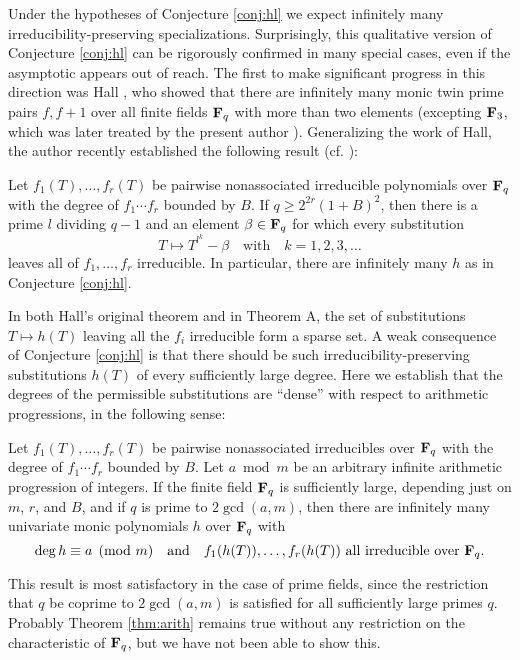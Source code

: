 \documentclass[a4paper]{compositio}
\begin{document}
Under the hypotheses of Conjecture \ref{conj:hl} we expect
infinitely many irreducibility-preserving specializations.
Surprisingly, this qualitative version of Conjecture \ref{conj:hl}
can be rigorously confirmed in many special  cases, even if the
asymptotic appears out of reach. The first to make significant
progress in this direction was Hall \cite{hall06}, who showed that
there are infinitely many monic twin prime pairs $f, f+1$ over all
finite fields $\mathbf{F}_q$ with more than two elements (excepting $\mathbf{F}_3$,
which was later treated by the present author \cite[Theorem
1]{pollack06a}). Generalizing the work of Hall, the author recently
established the following result (cf. \cite[Theorem 2]{pollack06a}):
\begin{thma} Let $f_1(T), \dots, f_r(T)$ be
pairwise nonassociated irreducible polynomials over $\mathbf{F}_q$ with the
degree of $f_1 \cdots f_r$ bounded by $B$. If $q \geq 2^{2r} \left(1
+ B\right)^2$, then there is a prime $l$ dividing $q-1$ and an
element $\beta \in \mathbf{F}_q$ for which every substitution
\[ T \mapsto T^{l^k}-\beta \quad \text{with} \quad k=1, 2, 3, \dots \]
leaves all of $f_1, \dots, f_r$ irreducible. In particular, there
are infinitely many $h$ as in Conjecture \ref{conj:hl}.
\end{thma}
In both Hall's original theorem and in Theorem A, the set of
substitutions $T \mapsto h(T)$ leaving all the $f_i$ irreducible
form a sparse set. A weak consequence of Conjecture \ref{conj:hl} is
that there should be such irreducibility-preserving substitutions
$h(T)$ of every sufficiently large degree. Here we establish that
the degrees of the permissible substitutions are ``dense'' with
respect to arithmetic progressions, in the following sense:

\begin{thm}\label{thm:arith} Let $f_1(T), \dots, f_r(T)$ be pairwise
nonassociated irreducibles over $\mathbf{F}_q$ with the degree of $f_1
\cdots f_r$ bounded by $B$. Let $a \bmod m$ be an arbitrary infinite
arithmetic progression of integers. If the finite field $\mathbf{F}_q$ is
sufficiently large, depending just on $m$, $r$, and $B$, and if $q$
is prime to $2\gcd(a,m)$, then there are infinitely many univariate
monic polynomials $h$ over $\mathbf{F}_q$ with
\[ \deg{h} \equiv a \pmod{m} \quad \text{and} \quad f_1(h(T)), \dots, f_r(h(T)) \text{ all irreducible over
$\mathbf{F}_q$}. \]
\end{thm}
This result is most satisfactory in the case of prime fields, since
the restriction that $q$ be coprime to $2\gcd(a,m)$ is satisfied for
all sufficiently large primes $q$. Probably Theorem \ref{thm:arith}
remains true without any restriction on the characteristic of
$\mathbf{F}_q$, but we have not been able to show this.
\end{document}
